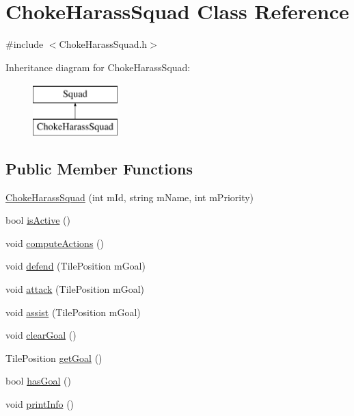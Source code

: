 \hypertarget{class_choke_harass_squad}{\section{Choke\-Harass\-Squad Class Reference}
\label{class_choke_harass_squad}
}


{\ttfamily \#include $<$Choke\-Harass\-Squad.\-h$>$}

Inheritance diagram for Choke\-Harass\-Squad\-:\begin{figure}[H]
\begin{center}
\leavevmode
\includegraphics[height=2.000000cm]{class_choke_harass_squad}
\end{center}
\end{figure}
\subsection*{Public Member Functions}
\begin{DoxyCompactItemize}
\item 
\hyperlink{class_choke_harass_squad_a58eeecb59ca8ccb6f06f63abb78ae7c8}{Choke\-Harass\-Squad} (int m\-Id, string m\-Name, int m\-Priority)
\item 
bool \hyperlink{class_choke_harass_squad_a539b0d145bf8f008dea8c43391d04b68}{is\-Active} ()
\item 
void \hyperlink{class_choke_harass_squad_a17ae34d4e776469004908c3b9fb82912}{compute\-Actions} ()
\item 
void \hyperlink{class_choke_harass_squad_a7246fcd5beca03ed7baeeb53d902335a}{defend} (Tile\-Position m\-Goal)
\item 
void \hyperlink{class_choke_harass_squad_a797d5de4bb64bfae0db084d57d025df5}{attack} (Tile\-Position m\-Goal)
\item 
void \hyperlink{class_choke_harass_squad_ad017919f055532c6dda726ebfe9eab94}{assist} (Tile\-Position m\-Goal)
\item 
void \hyperlink{class_choke_harass_squad_a204f26d3d521881db9dea355293ab3cd}{clear\-Goal} ()
\item 
Tile\-Position \hyperlink{class_choke_harass_squad_a87434b71eb3832c68bb77026774f0ded}{get\-Goal} ()
\item 
bool \hyperlink{class_choke_harass_squad_a634ed2e28b01a4681dc105df907394e6}{has\-Goal} ()
\item 
void \hyperlink{class_choke_harass_squad_ac7f907baeaa192a598f89dec7b503912}{print\-Info} ()
\end{DoxyCompactItemize}
